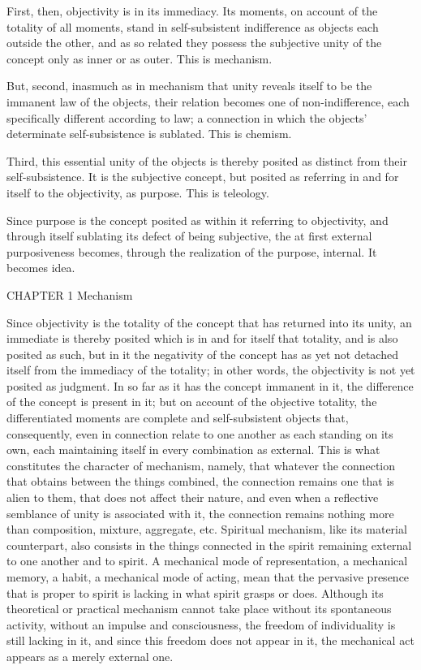 First, then, objectivity is in its immediacy.
Its moments, on account of the totality of all moments,
stand in self-subsistent indifference
as objects each outside the other,
and as so related they possess
the subjective unity of the concept
only as inner or as outer.
This is mechanism.

But, second, inasmuch as in mechanism that unity
reveals itself to be the immanent law of the objects,
their relation becomes one of non-indifference,
each specifically different according to law;
a connection in which the objects'
determinate self-subsistence is sublated.
This is chemism.

Third, this essential unity of the objects is
thereby posited as distinct from their self-subsistence.
It is the subjective concept,
but posited as referring in and for itself
to the objectivity, as purpose.
This is teleology.

Since purpose is the concept posited
as within it referring to objectivity,
and through itself sublating its defect
of being subjective,
the at first external purposiveness becomes,
through the realization of the purpose, internal.
It becomes idea.

CHAPTER 1 Mechanism

Since objectivity is the totality of the concept
that has returned into its unity,
an immediate is thereby posited
which is in and for itself that totality,
and is also posited as such,
but in it the negativity of the concept has as yet
not detached itself from the immediacy of the totality;
in other words, the objectivity is not yet posited as judgment.
In so far as it has the concept immanent in it,
the difference of the concept is present in it;
but on account of the objective totality,
the differentiated moments are
complete and self-subsistent objects
that, consequently, even in connection
relate to one another as each standing on its own,
each maintaining itself in every combination as external.
This is what constitutes the character of mechanism,
namely, that whatever the connection that
obtains between the things combined,
the connection remains one that is alien to them,
that does not affect their nature,
and even when a reflective semblance
of unity is associated with it,
the connection remains nothing more than
composition, mixture, aggregate, etc.
Spiritual mechanism, like its material counterpart,
also consists in the things connected in the spirit
remaining external to one another and to spirit.
A mechanical mode of representation,
a mechanical memory, a habit, a mechanical mode of acting,
mean that the pervasive presence that is proper to spirit
is lacking in what spirit grasps or does.
Although its theoretical or practical mechanism
cannot take place without its spontaneous activity,
without an impulse and consciousness,
the freedom of individuality is still lacking in it,
and since this freedom does not appear in it,
the mechanical act appears as a merely external one.

